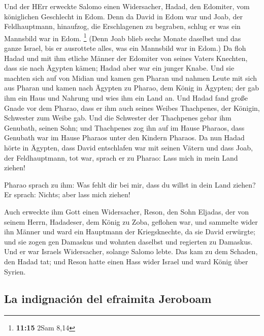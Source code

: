  Und der HErr erweckte Salomo einen Widersacher, Hadad,
den Edomiter, vom königlichen Geschlecht in Edom.  Denn
da David in Edom war und Joab, der Feldhauptmann, hinaufzog, die
Erschlagenen zu begraben, schlug er was ein Mannsbild war in Edom.
\footnote{\textbf{11:15} 2Sam 8,14}  (Denn Joab blieb
sechs Monate daselbst und das ganze Israel, bis er ausrottete alles, was
ein Mannsbild war in Edom.)  Da floh Hadad und mit ihm
etliche Männer der Edomiter von seines Vaters Knechten, dass sie nach
Ägypten kämen; Hadad aber war ein junger Knabe.  Und sie
machten sich auf von Midian und kamen gen Pharan und nahmen Leute mit
sich aus Pharan und kamen nach Ägypten zu Pharao, dem König in Ägypten;
der gab ihm ein Haus und Nahrung und wies ihm ein Land an.
 Und Hadad fand große Gnade vor dem Pharao, dass er ihm
auch seines Weibes Thachpenes, der Königin, Schwester zum Weibe gab.
 Und die Schwester der Thachpenes gebar ihm Genubath,
seinen Sohn; und Thachpenes zog ihn auf im Hause Pharaos, dass Genubath
war im Hause Pharaos unter den Kindern Pharaos.  Da nun
Hadad hörte in Ägypten, dass David entschlafen war mit seinen Vätern und
dass Joab, der Feldhauptmann, tot war, sprach er zu Pharao: Lass mich in
mein Land ziehen!

 Pharao sprach zu ihm: Was fehlt dir bei mir, dass du
willst in dein Land ziehen? Er sprach: Nichts; aber lass mich ziehen!

 Auch erweckte ihm Gott einen Widersacher, Reson, den
Sohn Eljadas, der von seinem Herrn, Hadadeser, dem König zu Zoba,
geflohen war,  und sammelte wider ihn Männer und ward ein
Hauptmann der Kriegsknechte, da sie David erwürgte; und sie zogen gen
Damaskus und wohnten daselbst und regierten zu Damaskus. 
Und er war Israels Widersacher, solange Salomo lebte. Das kam zu dem
Schaden, den Hadad tat; und Reson hatte einen Hass wider Israel und ward
König über Syrien.

\hypertarget{la-indignaciuxf3n-del-efraimita-jeroboam}{%
\subsection{La indignación del efraimita
Jeroboam}\label{la-indignaciuxf3n-del-efraimita-jeroboam}}

